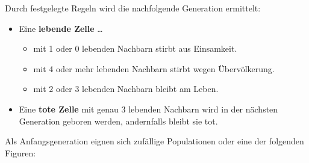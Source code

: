 Durch festgelegte Regeln wird die nachfolgende Generation ermittelt:
\begin{itemize}
	\item Eine \textbf{lebende Zelle} \dots
	\begin{itemize}
		\item mit 1 oder 0 lebenden Nachbarn stirbt aus Einsamkeit.
		\item mit 4 oder mehr lebenden Nachbarn stirbt wegen Übervölkerung.
		\item mit 2 oder 3 lebenden Nachbarn bleibt am Leben.
	\end{itemize}
	\item Eine \textbf{tote Zelle} mit genau 3 lebenden Nachbarn wird in der nächsten Generation geboren werden, andernfalls bleibt sie tot.
\end{itemize}

Als Anfangsgeneration eignen sich zufällige Populationen oder eine der folgenden Figuren:

